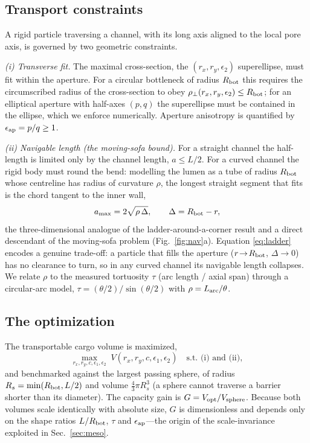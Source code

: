 \documentclass[aps,pre,twocolumn,superscriptaddress,floatfix,nofootinbib]{revtex4-2}
\begin{document}
\subsection{Transport constraints}

A rigid particle traversing a channel, with its long axis aligned to the local
pore axis, is governed by two geometric constraints.

\emph{(i) Transverse fit.} The maximal cross-section, the $(r_x,r_y,\epsilon_2)$
superellipse, must fit within the aperture. For a circular bottleneck of radius
$R_{\rm bot}$ this requires the circumscribed radius of the cross-section to obey
$\rho_\perp(r_x,r_y,\epsilon_2)\le R_{\rm bot}$; for an elliptical aperture with
half-axes $(p,q)$ the superellipse must be contained in the ellipse, which we
enforce numerically. Aperture anisotropy is quantified by
$\epsilon_{\rm ap}=p/q\ge 1$.

\emph{(ii) Navigable length (the moving-sofa bound).} For a straight channel the
half-length is limited only by the channel length, $a\le L/2$. For a curved
channel the rigid body must round the bend: modelling the lumen as a tube of
radius $R_{\rm bot}$ whose centreline has radius of curvature $\rho$, the longest
straight segment that fits is the chord tangent to the inner wall,
\begin{equation}
a_{\max}=2\sqrt{\rho\,\Delta},\qquad \Delta=R_{\rm bot}-r,
\label{eq:ladder}
\end{equation}
the three-dimensional analogue of the ladder-around-a-corner result and a direct
descendant of the moving-sofa problem (Fig.~\ref{fig:nav}a). Equation
\eqref{eq:ladder} encodes a genuine trade-off: a particle that fills the aperture
($r\!\to\!R_{\rm bot}$, $\Delta\!\to\!0$) has no clearance to turn, so in any
curved channel its navigable length collapses. We relate $\rho$ to the measured
tortuosity $\tau$ (arc length / axial span) through a circular-arc model,
$\tau=(\theta/2)/\sin(\theta/2)$ with $\rho=L_{\rm arc}/\theta$.

\subsection{The optimization}

The transportable cargo volume is maximized,
\begin{equation}
\max_{r_x,r_y,c,\epsilon_1,\epsilon_2}\; V(r_x,r_y,c,\epsilon_1,\epsilon_2)
\quad\text{s.t. (i) and (ii)},
\label{eq:opt}
\end{equation}
and benchmarked against the largest passing sphere, of radius
$R_s=\min(R_{\rm bot},L/2)$ and volume $\tfrac{4}{3}\pi R_s^3$ (a sphere cannot
traverse a barrier shorter than its diameter). The capacity gain is
$G=V_{\rm opt}/V_{\rm sphere}$. Because both volumes scale identically with
absolute size, $G$ is dimensionless and depends only on the shape ratios
$L/R_{\rm bot}$, $\tau$ and $\epsilon_{\rm ap}$---the origin of the
scale-invariance exploited in Sec.~\ref{sec:meso}.
\end{document}
